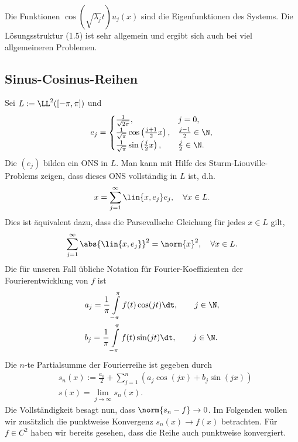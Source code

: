 \begin{bem}
\label{bem:1.48}
Die Funktionen $\cos\left(\sqrt{\lambda_j}t\right)u_j(x)$ sind die
Eigenfunktionen des Systems. Die Lösungsstruktur (1.5) ist sehr allgemein und
ergibt sich auch bei viel allgemeineren Problemen.\maphere
\end{bem}

\subsection{Sinus-Cosinus-Reihen}

Sei $L:=\LL^2([-\pi,\pi])$ und
\begin{align*}
e_j = \begin{cases}
\frac{1}{\sqrt{2\pi}}, & j=0,\\
\frac{1}{\sqrt{\pi}}\cos\left(\frac{j+1}{2}x\right), & \frac{j-1}{2}\in\N,\\
\frac{1}{\sqrt{\pi}}\sin\left(\frac{j}{2}x\right), & \frac{j}{2}\in\N.
\end{cases}
\end{align*}
Die $(e_j)$ bilden ein ONS in $L$. Man kann mit Hilfe des
Sturm-Liouville-Problems zeigen, dass dieses ONS vollständig in $L$ ist, d.h.
\begin{align*}
x = \sum\limits_{j=1}^\infty \lin{x,e_j}e_j,\quad \forall x\in L.
\end{align*}
Dies ist äquivalent dazu, dass die Parsevallsche Gleichung für jedes $x\in L$
gilt,
\begin{align*}
\sum\limits_{j=1}^\infty \abs{\lin{x,e_j}}^2 = \norm{x}^2,\quad \forall x\in L.
\end{align*}
Die für unseren Fall übliche Notation für Fourier-Koeffizienten der
Fourierentwicklung von $f$ ist
\begin{align*}
&a_j = \frac{1}{\pi}\int\limits_{-\pi}^\pi f(t)\cos(jt)\dt,\qquad j\in\N,\\
&b_j = \frac{1}{\pi}\int\limits_{-\pi}^\pi f(t)\sin(jt)\dt,\qquad j\in\N.
\end{align*}
Die $n$-te Partialsumme der Fourierreihe ist gegeben durch
\begin{align*}
&s_n(x) := \frac{a_0}{2} + \sum\limits_{j=1}^n \left(a_j\cos(jx) + b_j\sin(jx)
\right)\\
&s(x) = \lim\limits_{j\to\infty} s_n(x).
\end{align*}
Die Vollständigkeit besagt nun, dass $\norm{s_n-f}\to0$. Im Folgenden wollen
wir zusätzlich die punktweise Konvergenz $s_n(x)\to f(x)$ betrachten. Für
$f\in C^2$ haben wir bereits gesehen, dass die Reihe auch punktweise
konvergiert.


